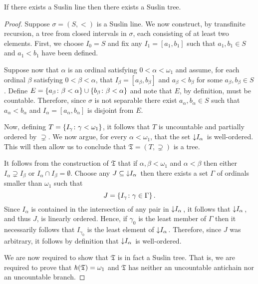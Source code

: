 \begin{lem}\label{lem:ltree}
	If there exists a Suslin line then there exists a Suslin tree.
\end{lem}
\begin{proof}
    Suppose $\sigma=(S,<)$ is a Suslin line.  We now construct, by transfinite
    recursion, a tree from closed intervals in $\sigma$, each consisting of at
    least two elements.  First, we choose $I_0=S$ and fix any $I_1=[a_1,b_1]$
    such that $a_1,b_1\in S$ and $a_1<b_1$ have been defined.

    Suppose now that $\alpha$ is an ordinal satisfying $0<\alpha<\omega_1$ and
    assume, for each ordinal $\beta$ satisfying $0<\beta<\alpha$, that
    $I_\beta=[a_\beta,b_\beta]$ and $a_\beta<b_\beta$ for some
    $a_\beta,b_\beta\in S$.  Define
    $E=\left\lbrace a_\beta\colon \beta<\alpha \right\rbrace\cup\left\lbrace b_\beta\colon \beta<\alpha \right\rbrace$ and
    note that $E$, by definition, must be countable.  Therefore, since $\sigma$
    is not separable there exist $a_\alpha,b_\alpha\in S$ such that
    $a_\alpha<b_\alpha$ and $I_\alpha=[a_\alpha,b_\alpha]$ is disjoint from $E$.

    Now, defining $T=\left\lbrace I_\gamma\colon \gamma<\omega_1 \right\rbrace$, it follows that $T$
    is uncountable and partially ordered by $\supsetneq$.  We now argue, for
    every $\alpha<\omega_1$, that the set $\left\downarrow I_\alpha\right.$ is well-ordered.
    This will then allow us to conclude that $\mathfrak{T}=(T,\supsetneq)$ is a
    tree.

    It follows from the construction of $\mathfrak{T}$ that if
    $\alpha,\beta<\omega_1$ and $\alpha<\beta$ then either $I_\alpha\supsetneq
    I_\beta$ or $I_\alpha\cap I_\beta=\emptyset$.  Choose any $J\subseteq
    \left\downarrow I_{\alpha}\right.$ then there exists a set $\Gamma$ of ordinals smaller than
    $\omega_{1}$ such that \begin{equation}
    J=\left\lbrace I_{\gamma}\colon \gamma\in\Gamma \right\rbrace. \end{equation} Since $I_{\alpha}$
    is contained in the intersection of any pair in $\left\downarrow I_{\alpha}\right.$, it
    follows that $\left\downarrow I_{\alpha}\right.$, and thus $J$, is linearly ordered.  Hence,
    if $\gamma_{0}$ is the least member of $\Gamma$ then it necessarily follows
    that $I_{\gamma_{0}}$ is the least element of $\left\downarrow I_{\alpha}\right.$.
    Therefore, since $J$ was arbitrary, it follows by definition that
    $\left\downarrow I_{\alpha}\right.$ is well-ordered.

    We are now required to show that $\mathfrak{T}$ is in fact a Suslin tree.
    That is, we are required to prove that $\mathit{h}(\mathfrak{T})=\omega_1$ and
    $\mathfrak{T}$ has neither an uncountable antichain nor an uncountable
    branch.


\end{proof}
